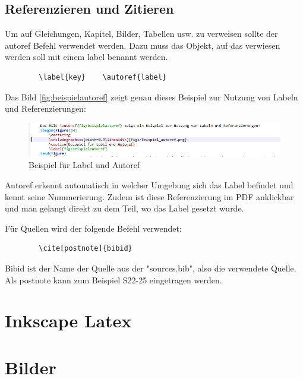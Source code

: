 \documentclass[
12pt,
a4paper,
headings=small,                    %
bibliography=totoc,                %
listof=totoc,                      %
parskip=half*,                     %
]{scrartcl}                        %
\begin{document}
	\subsection{Referenzieren und Zitieren}
	Um auf Gleichungen, Kapitel, Bilder, Tabellen usw. zu verweisen sollte der autoref Befehl verwendet werden. Dazu muss das Objekt, auf das verwiesen werden soll mit einem label benannt werden.
	\begin{verbatim}
		\label{key}    \autoref{label}
	\end{verbatim}
	Das Bild \autoref{fig:beispielautoref} zeigt genau dieses Beispiel zur Nutzung von Labeln und Referenzierungen:
	\begin{figure}[H]
		\centering
		\includegraphics[width=1.0\linewidth]{figs/Beispiel_autoref.png}
		\caption{Beispiel für Label und Autoref}
		\label{fig:beispielautoref}
	\end{figure}
	Autoref erkennt automatisch in welcher Umgebung sich das Label befindet und kennt seine Nummerierung. Zudem ist diese Referenzierung im PDF anklickbar und man gelangt direkt zu dem Teil, wo das Label gesetzt wurde.\newline\newline
	
	Für Quellen wird der folgende Befehl verwendet:
	\begin{verbatim}
		\cite[postnote]{bibid}
	\end{verbatim}
	Bibid ist der Name der Quelle aus der "sources.bib", also die verwendete Quelle.\newline
	Als postnote kann zum Beispiel S22-25 eingetragen werden.
	
	
	
	\newpage
	\section{Inkscape Latex}
	
	
	
	
	\newpage
	\section{Bilder}
\end{document}

